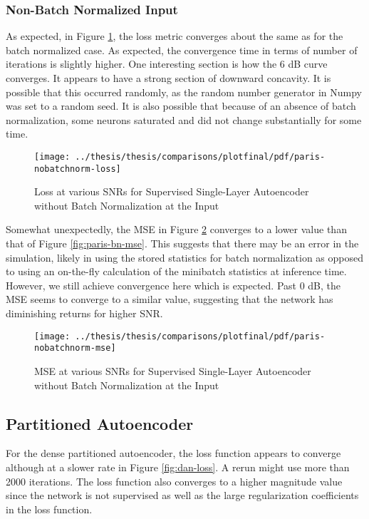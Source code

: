 \subsubsection{Non-Batch Normalized Input}

As expected, in Figure \ref{fig:paris-loss}, the loss metric converges about the same as for the batch normalized case. As expected, the convergence time in terms of number of iterations is slightly higher. One interesting section is how the 6 dB curve converges. It appears to have a strong section of downward concavity. It is possible that this occurred randomly, as the random number generator in Numpy was set to a random seed. It is also possible that because of an absence of batch normalization, some neurons saturated and did not change substantially for some time.

\begin{figure}[!ht]
\centering
\texttt{[image: ../thesis/thesis/comparisons/plotfinal/pdf/paris-nobatchnorm-loss]}
\caption{Loss at various SNRs for Supervised Single-Layer Autoencoder without Batch Normalization at the Input}\label{fig:paris-loss}
\end{figure}

Somewhat unexpectedly, the MSE in Figure \ref{fig:paris-mse} converges to a lower value than that of Figure \ref{fig:paris-bn-mse}. This suggests that there may be an error in the simulation, likely in using the stored statistics for batch normalization as opposed to using an on-the-fly calculation of the minibatch statistics at inference time. However, we still achieve convergence here which is expected. Past 0 dB, the MSE seems to converge to a similar value, suggesting that the network has diminishing returns for higher SNR.

\begin{figure}[!ht]
\centering
\texttt{[image: ../thesis/thesis/comparisons/plotfinal/pdf/paris-nobatchnorm-mse]}
\caption{MSE at various SNRs for Supervised Single-Layer Autoencoder without Batch Normalization at the Input}\label{fig:paris-mse}
\end{figure}


\subsection{Partitioned Autoencoder}

For the dense partitioned autoencoder, the loss function appears to converge although at a slower rate in Figure \ref{fig:dan-loss}. A rerun might use more than 2000 iterations. The loss function also converges to a higher magnitude value since the network is not supervised as well as the large regularization coefficients in the loss function.


